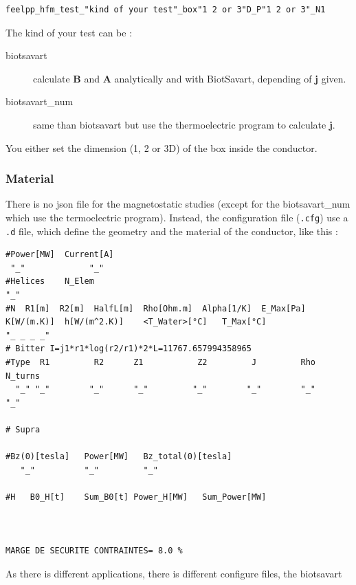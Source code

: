 \documentclass[11pt]{amsart}
\begin{document}
\begin{verbatim}
feelpp_hfm_test_"kind of your test"_box"1 2 or 3"D_P"1 2 or 3"_N1
\end{verbatim}

The kind of your test can be :


\begin{description}

\item[biotsavart]calculate \textbf{B} and \textbf{A} analytically and with BiotSavart, depending of \textbf{j} given.

\item[biotsavart\_num]same than biotsavart but use the thermoelectric program to calculate \textbf{j}.

\end{description}


You either set the dimension (1, 2 or 3D) of the box inside the conductor.


\hypertarget{x-material}{\subsubsection{Material}}
There is no json file for the magnetostatic studies (except for the biotsavart\_num which use the termoelectric program).
Instead, the configuration file (\texttt{.cfg}) use a \texttt{.d} file, which define the geometry and the material of the conductor, like this :


\begin{verbatim}
#Power[MW]	Current[A]
 "_"  		     "_"
#Helices	N_Elem
"_"
#N	R1[m]  R2[m]  HalfL[m]	Rho[Ohm.m]  Alpha[1/K]	E_Max[Pa]	K[W/(m.K)]	h[W/(m^2.K)]	<T_Water>[°C]	T_Max[°C]
"_ _ _ _"
# Bitter I=j1*r1*log(r2/r1)*2*L=11767.657994358965
#Type  R1         R2      Z1           Z2         J         Rho	  	N_turns
  "_" "_"        "_"      "_"         "_"        "_"        "_"      "_"

# Supra

#Bz(0)[tesla]	Power[MW]	Bz_total(0)[tesla]
   "_"          "_"         "_"

#H   B0_H[t]	Sum_B0[t] Power_H[MW]	Sum_Power[MW]



MARGE DE SECURITE CONTRAINTES= 8.0 %
\end{verbatim}

As there is different applications, there is different configure files, the biotsavart
\end{document}

